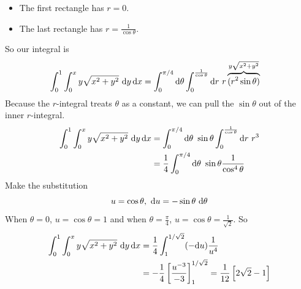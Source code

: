 \begin{eg}
\begin{itemize}
\begin{itemize}
\item
The first rectangle has $r=0$.
\item
The last rectangle has $r=\frac{1}{\cos\theta}$.
\end{itemize}
\vspace{-\topsep}
\end{itemize}
So our integral is
\begin{align*}
\int_0^1\int_0^x y\sqrt{x^2+y^2}\ \dee{y}\,\dee{x}
&=\int_0^{\pi/4}\dee{\theta}\int_0^{\frac{1}{\cos\theta}}\dee{r}\ 
     r\overbrace{(r^2\sin\theta)}^{y\sqrt{x^2+y^2}}
\end{align*}
Because the $r$-integral treats $\theta$ as a constant, we can pull the
$\sin\theta$ out of the inner $r$-integral.
\begin{align*}
\int_0^1\int_0^x y\sqrt{x^2+y^2}\ \dee{y}\,\dee{x}
&=\int_0^{\pi/4}\dee{\theta}\ \sin\theta\int_0^{\frac{1}{\cos\theta}}\dee{r}\ 
     r^3 \\
&=\frac{1}{4}\int_0^{\pi/4}\dee{\theta}\ \sin\theta\frac{1}{\cos^4\theta} 
\end{align*}
Make the substitution
\begin{equation*}
u=\cos\theta,\ \dee{u}=-\sin\theta\ \dee{\theta}
\end{equation*}
When $\theta=0$, $u=\cos\theta=1$ and when $\theta=\frac{\pi}{4}$,
$u=\cos\theta=\frac{1}{\sqrt{2}}$. So
\begin{align*}
\int_0^1\int_0^x y\sqrt{x^2+y^2}\ \mathrm{d}y\,\mathrm{d}x
&=\frac{1}{4}\int_1^{1/\sqrt{2}} (-\mathrm{d}u)\frac{1}{u^4}  \\
&=-\frac{1}{4}\left[\frac{u^{-3}}{-3}\right]_1^{1/\sqrt{2}} 
=\frac{1}{12}\left[2\sqrt{2}-1\right]
\end{align*}
\end{eg}

